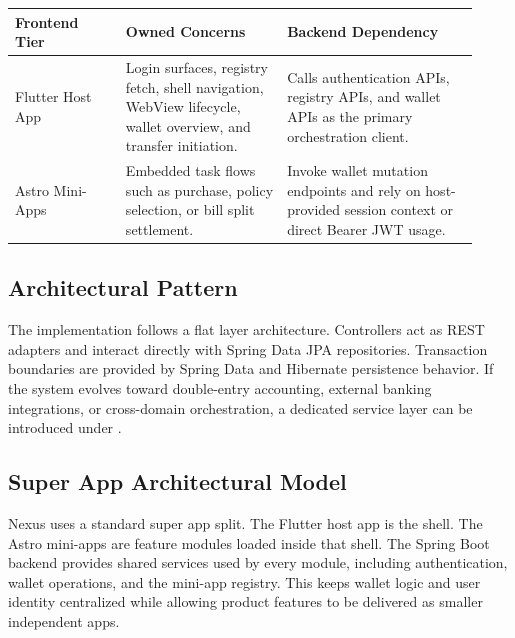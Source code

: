 \documentclass[11pt,a4paper]{article}
\newcommand{\code}[1]{\path{#1}}
\begin{document}
\begin{longtable}{p{0.22\linewidth} p{0.32\linewidth} p{0.38\linewidth}}
\toprule
\textbf{Frontend Tier} & \textbf{Owned Concerns} & \textbf{Backend Dependency} \\
\midrule
Flutter Host App & Login surfaces, registry fetch, shell navigation, WebView lifecycle, wallet overview, and transfer initiation. & Calls authentication APIs, registry APIs, and wallet APIs as the primary orchestration client. \\
Astro Mini-Apps & Embedded task flows such as purchase, policy selection, or bill split settlement. & Invoke wallet mutation endpoints and rely on host-provided session context or direct Bearer JWT usage. \\
\bottomrule
\end{longtable}

\subsection{Architectural Pattern}
The implementation follows a flat layer architecture. Controllers act as REST adapters and interact directly with Spring Data JPA repositories. Transaction boundaries are provided by Spring Data and Hibernate persistence behavior. If the system evolves toward double-entry accounting, external banking integrations, or cross-domain orchestration, a dedicated service layer can be introduced under \code{com.nexus.finance.service}.

\subsection{Super App Architectural Model}
Nexus uses a standard super app split. The Flutter host app is the shell. The Astro mini-apps are feature modules loaded inside that shell. The Spring Boot backend provides shared services used by every module, including authentication, wallet operations, and the mini-app registry. This keeps wallet logic and user identity centralized while allowing product features to be delivered as smaller independent apps.
\end{document}
